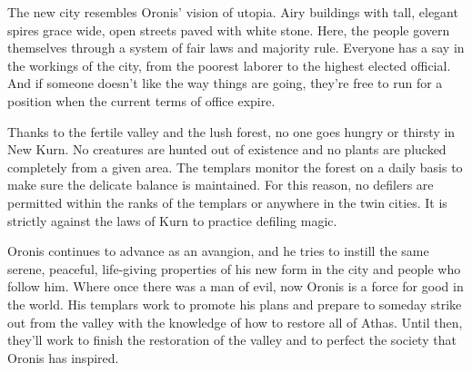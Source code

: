 {	The new city resembles Oronis’ vision of utopia. Airy buildings with tall, elegant spires grace wide, open streets paved with white stone. Here, the people govern themselves through a system of fair laws and majority rule. Everyone has a say in the workings of the city, from the poorest laborer to the highest elected official. And if someone doesn’t like the way things are going, they’re free to run for a position when the current terms of office expire.

	Thanks to the fertile valley and the lush forest, no one goes hungry or thirsty in New Kurn. No creatures are hunted out of existence and no plants are plucked completely from a given area. The templars monitor the forest on a daily basis to make sure the delicate balance is maintained. For this reason, no defilers are permitted within the ranks of the templars or anywhere in the twin cities. It is strictly against the laws of Kurn to practice defiling magic.

	Oronis continues to advance as an avangion, and he tries to instill the same serene, peaceful, life‐giving properties of his new form in the city and people who follow him. Where once there was a man of evil, now Oronis is a force for good in the world. His templars work to promote his plans and prepare to someday strike out from the valley with the knowledge of how to restore all of Athas. Until then, they’ll work to finish the restoration of the valley and to perfect the society that Oronis has inspired.
}
